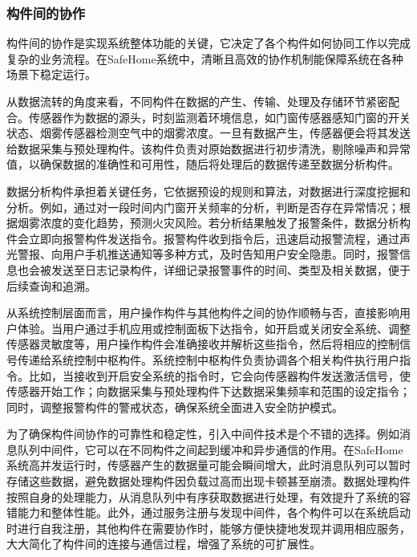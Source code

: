 \subsubsection{构件间的协作}

构件间的协作是实现系统整体功能的关键，它决定了各个构件如何协同工作以完成复杂的业务流程。在SafeHome系统中，清晰且高效的协作机制能保障系统在各种场景下稳定运行。

从数据流转的角度来看，不同构件在数据的产生、传输、处理及存储环节紧密配合。传感器作为数据的源头，时刻监测着环境信息，如门窗传感器感知门窗的开关状态、烟雾传感器检测空气中的烟雾浓度。一旦有数据产生，传感器便会将其发送给数据采集与预处理构件。该构件负责对原始数据进行初步清洗，剔除噪声和异常值，以确保数据的准确性和可用性，随后将处理后的数据传递至数据分析构件。

数据分析构件承担着关键任务，它依据预设的规则和算法，对数据进行深度挖掘和分析。例如，通过对一段时间内门窗开关频率的分析，判断是否存在异常情况；根据烟雾浓度的变化趋势，预测火灾风险。若分析结果触发了报警条件，数据分析构件会立即向报警构件发送指令。报警构件收到指令后，迅速启动报警流程，通过声光警报、向用户手机推送通知等多种方式，及时告知用户安全隐患。同时，报警信息也会被发送至日志记录构件，详细记录报警事件的时间、类型及相关数据，便于后续查询和追溯。

从系统控制层面而言，用户操作构件与其他构件之间的协作顺畅与否，直接影响用户体验。当用户通过手机应用或控制面板下达指令，如开启或关闭安全系统、调整传感器灵敏度等，用户操作构件会准确接收并解析这些指令，然后将相应的控制信号传递给系统控制中枢构件。系统控制中枢构件负责协调各个相关构件执行用户指令。比如，当接收到开启安全系统的指令时，它会向传感器构件发送激活信号，使传感器开始工作；向数据采集与预处理构件下达数据采集频率和范围的设定指令；同时，调整报警构件的警戒状态，确保系统全面进入安全防护模式。

为了确保构件间协作的可靠性和稳定性，引入中间件技术是个不错的选择。例如消息队列中间件，它可以在不同构件之间起到缓冲和异步通信的作用。在SafeHome系统高并发运行时，传感器产生的数据量可能会瞬间增大，此时消息队列可以暂时存储这些数据，避免数据处理构件因负载过高而出现卡顿甚至崩溃。数据处理构件按照自身的处理能力，从消息队列中有序获取数据进行处理，有效提升了系统的容错能力和整体性能。此外，通过服务注册与发现中间件，各个构件可以在系统启动时进行自我注册，其他构件在需要协作时，能够方便快捷地发现并调用相应服务，大大简化了构件间的连接与通信过程，增强了系统的可扩展性。